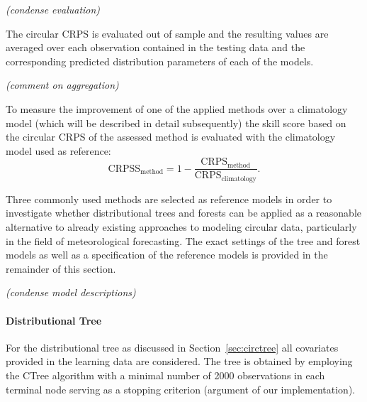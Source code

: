 \documentclass[nojss]{jss}
\newcommand{\fixme}[1]{\emph{\marginpar{FIXME} (#1)}}
\numberwithin{equation}{section}
\begin{document}
\fixme{condense evaluation}

The circular CRPS is evaluated out of sample and the resulting values are averaged over 
each observation contained in the testing data and the corresponding predicted distribution 
parameters of each of the models.

\fixme{comment on aggregation}

To measure the improvement of one of the applied methods over a climatology model (which will 
be described in detail subsequently) the skill score based on the circular 
CRPS of the assessed method is evaluated with the climatology model used as reference:
\begin{equation}
\text{CRPSS}_{\text{method}} = 1 - \frac{\text{CRPS}_{\text{method}}}{\text{CRPS}_{\text{climatology}}}.
\end{equation}

Three commonly used methods are selected as reference models in order to investigate whether 
distributional trees and forests can be applied as a reasonable alternative to already
existing approaches to modeling circular data, particularly in the field of meteorological forecasting.
The exact settings of the tree and forest models as well as a specification of the reference models
is provided in the remainder of this section.

\fixme{condense model descriptions}

\paragraph{Distributional Tree}
For the distributional tree as discussed in Section~\ref{sec:circtree} all covariates provided in the 
learning data are considered. The tree is obtained by employing the CTree algorithm with a minimal 
number of 2000 observations in each terminal node serving as a stopping criterion 
(argument  of our implementation).
\end{document}

